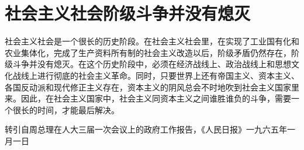 \section[社会主义社会阶级斗争并没有熄灭（一九六四年）]{社会主义社会阶级斗争并没有熄灭}


社会主义社会是一个很长的历史阶段。在社会主义社会里，在实现了工业国有化和农业集体化，完成了生产资料所有制的社会主义改造以后，阶级矛盾仍然存在，阶级斗争并没有熄灭。在这个历史阶段中，必须在经济战线上、政治战线上和思想文化战线上进行彻底的社会主义革命。同时，只要世界上还有帝国主义、资本主义、各国反动派和现代修正主义存在，资本主义的阴风总会不时地吹到社会主义国家里来。因此，在社会主义国家中，社会主义同资本主义之间谁胜谁负的斗争，需要一个很长的时间，才能最后解决。

{\raggedleft 转引自周总理在人大三届一次会议上的政府工作报告，《人民日报》一九六五年一月一日\par}


